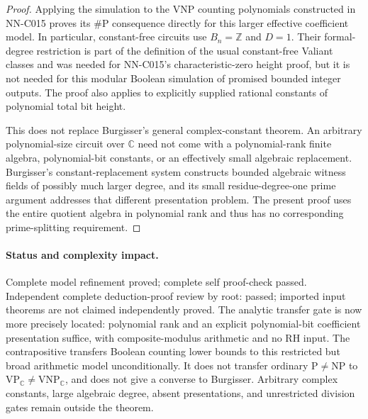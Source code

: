 \begin{proof}
Applying the simulation to the VNP counting polynomials constructed in NN-C015 proves its $\#\mathrm P$ consequence directly for this larger effective coefficient model. In particular, constant-free circuits use $B_n=\mathbb Z$ and $D=1$. Their formal-degree restriction is part of the definition of the usual constant-free Valiant classes and was needed for NN-C015's characteristic-zero height proof, but it is not needed for this modular Boolean simulation of promised bounded integer outputs. The proof also applies to explicitly supplied rational constants of polynomial total bit height.

This does not replace Burgisser's general complex-constant theorem. An arbitrary polynomial-size circuit over $\mathbb C$ need not come with a polynomial-rank finite algebra, polynomial-bit constants, or an effectively small algebraic replacement. Burgisser's constant-replacement system constructs bounded algebraic witness fields of possibly much larger degree, and its small residue-degree-one prime argument addresses that different presentation problem. The present proof uses the entire quotient algebra in polynomial rank and thus has no corresponding prime-splitting requirement.
\end{proof}
\paragraph{Status and complexity impact.}
Complete model refinement proved; complete self proof-check passed. Independent complete deduction-proof review by root: passed; imported input theorems are not claimed independently proved. The analytic transfer gate is now more precisely located: polynomial rank and an explicit polynomial-bit coefficient presentation suffice, with composite-modulus arithmetic and no RH input. The contrapositive transfers Boolean counting lower bounds to this restricted but broad arithmetic model unconditionally. It does not transfer ordinary $\mathrm P\ne\mathrm{NP}$ to $\mathrm{VP}_{\mathbb C}\ne\mathrm{VNP}_{\mathbb C}$, and does not give a converse to Burgisser. Arbitrary complex constants, large algebraic degree, absent presentations, and unrestricted division gates remain outside the theorem.


